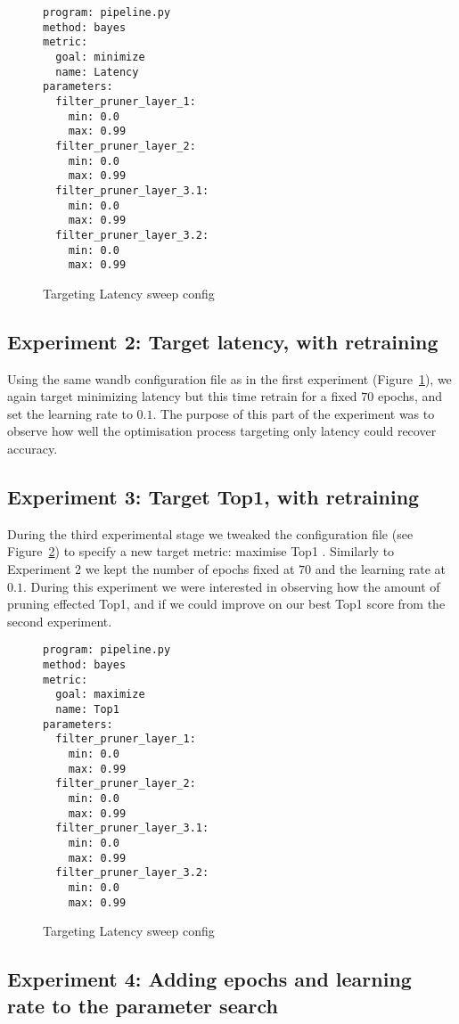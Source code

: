 \documentclass[../Dissertation.tex]{subfiles}
\begin{document}
\singlespacing
\begin{figure}[H]
    \centering
    \begin{verbatim}
program: pipeline.py
method: bayes
metric:
  goal: minimize
  name: Latency
parameters:
  filter_pruner_layer_1:
    min: 0.0
    max: 0.99
  filter_pruner_layer_2:
    min: 0.0
    max: 0.99
  filter_pruner_layer_3.1:
    min: 0.0
    max: 0.99
  filter_pruner_layer_3.2:
    min: 0.0
    max: 0.99
    \end{verbatim}
    \caption{Targeting Latency sweep config}
    \label{fig:LatencySweepConfig}
\end{figure}
\doublespacing

\subsection{Experiment 2: Target latency, with retraining}

Using the same wandb configuration file as in the first experiment (Figure~\ref{fig:LatencySweepConfig}), we again target minimizing latency but this time retrain for a fixed $70$ epochs, and set the learning rate to $0.1$.
The purpose of this part of the experiment was to observe how well the optimisation process targeting only latency could recover accuracy.

\subsection{Experiment 3: Target Top1, with retraining}
During the third experimental stage we tweaked the configuration file (see Figure~\ref{fig:Top1SweepConfig}) to specify a new target metric: maximise Top1 .
Similarly to Experiment 2 we kept the number of epochs fixed at $70$ and the learning rate at $0.1$.
During this experiment we were interested in observing how the amount of pruning effected Top1, and if we could improve on our best Top1 score from the second experiment.

\singlespacing
\begin{figure}[H]
    \centering
    \begin{verbatim}
program: pipeline.py
method: bayes
metric:
  goal: maximize
  name: Top1
parameters:
  filter_pruner_layer_1:
    min: 0.0
    max: 0.99
  filter_pruner_layer_2:
    min: 0.0
    max: 0.99
  filter_pruner_layer_3.1:
    min: 0.0
    max: 0.99
  filter_pruner_layer_3.2:
    min: 0.0
    max: 0.99
    \end{verbatim}
    \caption{Targeting Latency sweep config}
    \label{fig:Top1SweepConfig}
\end{figure}
\doublespacing

\subsection{Experiment 4: Adding epochs and learning rate to the parameter search}
\end{document}
